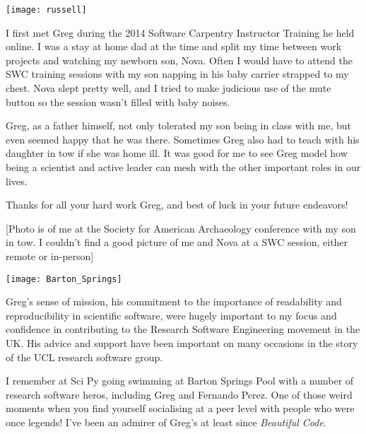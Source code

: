 \newpage
\vspace*{\fill}
\begin{minipage}{0.45\textwidth}
    \texttt{[image: russell]}
\end{minipage}
\hfill
\begin{minipage}{0.45\textwidth}
\setlength{\parindent}{0in}
\setlength{\parskip}{1em}
I first met Greg during the 2014 Software Carpentry Instructor Training he held
online. I was a stay at home dad at the time and split my time between work
projects and watching my newborn son, Nova. Often I would have to attend
the SWC training sessions with my son napping in his baby carrier strapped
to my chest. Nova slept pretty well, and I tried to make judicious use of
the mute button so the session wasn't filled with baby noises. 

Greg, as a father himself, not only tolerated my son being in class with
me, but even seemed happy that he was there. Sometimes Greg also had to
teach with his daughter in tow if she was home ill. It was good for me to
see Greg model how being a scientist and active leader can mesh with the
other important roles in our lives. 

Thanks for all your hard work Greg, and best of luck in your future endeavors! 

[Photo is of me at the Society for American Archaeology conference with my son
in tow. I couldn't find a good picture of me and Nova at a SWC session, either
remote or in-person]

\end{minipage}
\vspace*{\fill}

\newpage
\vspace*{\fill}

\texttt{[image: Barton\_Springs]}

Greg's sense of mission, his commitment to the importance of readability and
reproducibility in scientific software, were hugely important to my focus and
confidence in contributing to the Research Software Engineering movement in the
UK. His advice and support have been important on many occasions in the story
of the UCL research software group.

I remember at Sci Py going swimming at Barton Springs Pool with a number of
research software heros, including Greg and Fernando Perez. One of those weird
moments when you find yourself socialising at a peer level with people who were
once legends! I've been an admirer of Greg's at least since \textit{Beautiful
Code}.

